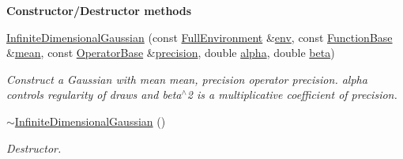 \begin{Indent}{\bf Constructor/\-Destructor methods}\par
\begin{DoxyCompactItemize}
\item 
\hyperlink{class_q_u_e_s_o_1_1_infinite_dimensional_gaussian_a3dbfc9028e821ebdee212bf60bf1cf35}{Infinite\-Dimensional\-Gaussian} (const \hyperlink{class_q_u_e_s_o_1_1_full_environment}{Full\-Environment} \&\hyperlink{class_q_u_e_s_o_1_1_infinite_dimensional_gaussian_a16bf46c24315506ddca4739b05579b92}{env}, const \hyperlink{class_q_u_e_s_o_1_1_function_base}{Function\-Base} \&\hyperlink{class_q_u_e_s_o_1_1_infinite_dimensional_gaussian_a9d12c4e80eca7d797381c734d6d3476e}{mean}, const \hyperlink{class_q_u_e_s_o_1_1_operator_base}{Operator\-Base} \&\hyperlink{class_q_u_e_s_o_1_1_infinite_dimensional_gaussian_af08c847ce01c948b60f72be309c60b37}{precision}, double \hyperlink{class_q_u_e_s_o_1_1_infinite_dimensional_gaussian_ab3d6cf41482750591ccd8bbe2426a98d}{alpha}, double \hyperlink{class_q_u_e_s_o_1_1_infinite_dimensional_gaussian_a36618403cf2767efbde981a43b900a91}{beta})
\begin{DoxyCompactList}\small\item\em Construct a Gaussian with mean {\ttfamily mean}, precision operator {\ttfamily precision}. {\ttfamily alpha} controls regularity of draws and {\ttfamily beta$^\wedge$2} is a multiplicative coefficient of {\ttfamily precision}. \end{DoxyCompactList}\item 
\hyperlink{class_q_u_e_s_o_1_1_infinite_dimensional_gaussian_aeb80c76a7c9540756a4e5c23e8b9a836}{$\sim$\-Infinite\-Dimensional\-Gaussian} ()
\begin{DoxyCompactList}\small\item\em Destructor. \end{DoxyCompactList}\end{DoxyCompactItemize}
\end{Indent}

